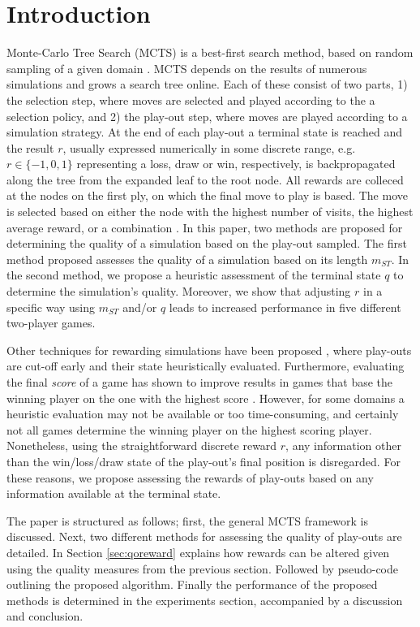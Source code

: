 \documentclass{ecai2010}
\begin{document}
\section{Introduction}
\label{sec:intro}
Monte-Carlo Tree Search (MCTS) is a best-first search method, based on random sampling of a given domain \cite{kocsis2006bandit, coulom2007efficient}. MCTS depends on the results of numerous simulations and grows a search tree online. Each of these consist of two parts, 1) the selection step, where moves are selected and played according to the a selection policy, and 2) the play-out step, where moves are played according to a simulation strategy. At the end of each play-out a terminal state is reached and the result $r$, usually expressed numerically in some discrete range, e.g. $r \in \{-1, 0, 1\}$ representing a loss, draw or win, respectively, is backpropagated along the tree from the expanded leaf to the root node. All rewards are colleced at the nodes on the first ply, on which the final move to play is based. The move is selected based on either the node with the highest number of visits, the highest average reward, or a combination \cite{chaslot2008progressive}. In this paper, two methods are proposed for determining the quality of a simulation based on the play-out sampled. The first method proposed assesses the quality of a simulation based on its length $m_{ST}$. In the second method, we propose a heuristic assessment of the terminal state $q$ to determine the simulation's quality. Moreover, we show that adjusting $r$ in a specific way using  $m_{ST}$ and/or $q$ leads to increased performance in five different two-player games.

Other techniques for rewarding simulations have been proposed \cite{Winands2010a}, where play-outs are cut-off early and their state heuristically evaluated. Furthermore, evaluating the final \emph{score} of a game has shown to improve results in games that base the winning player on the one with the highest score \cite{shibahara2008combining}. However, for some domains a heuristic evaluation may not be available or too time-consuming, and certainly not all games determine the winning player on the highest scoring player. Nonetheless, using the straightforward discrete reward $r$, any information other than the win/loss/draw state of the play-out's final position is disregarded. For these reasons, we propose assessing the rewards of play-outs based on any information available at the terminal state.

The paper is structured as follows; first, the general MCTS framework is discussed. Next, two different methods for assessing the quality of play-outs are detailed. In Section \ref{sec:qoreward} explains how rewards can be altered given using the quality measures from the previous section. Followed by pseudo-code outlining the proposed algorithm. Finally the performance of the proposed methods is determined in the experiments section, accompanied by a discussion and conclusion.
\end{document}
